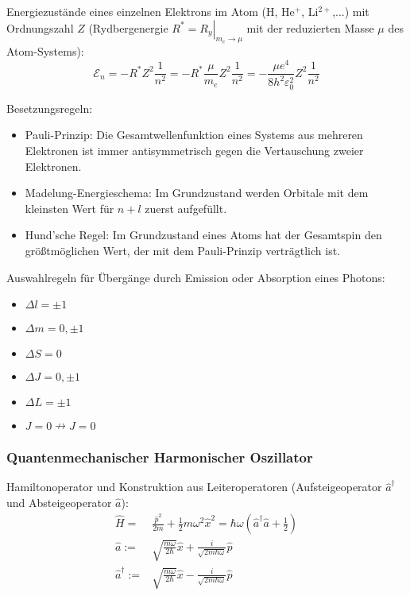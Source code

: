 \documentclass[11pt]{article}
\numberwithin{equation}{section}
\begin{document}
				\noindent
				Energiezustände eines einzelnen Elektrons im Atom ($\mathrm{H}$, $\mathrm{He^{+}}$, $\mathrm{Li^{2+}}$,...) mit Ordnungszahl $Z$ (Rydbergenergie $\left.R^*=R_y\right|_{m_e\rightarrow \mu}$ mit der reduzierten Masse $\mu$ des Atom-Systems):
				\begin{equation}
					\mathcal{E}_n = -R^* Z^2 \frac{1}{n^2} = -R^* \frac{\mu}{m_e} Z^2 \frac{1}{n^2} = - \frac{\mu e^4}{8 h^2 \varepsilon_0^2} Z^2 \frac{1}{n^2}
				\end{equation}

				\noindent
				Besetzungsregeln:
				\begin{itemize}
					\item Pauli-Prinzip: Die Gesamtwellenfunktion eines Systems aus mehreren Elektronen ist immer antisymmetrisch	gegen die Vertauschung zweier Elektronen.
					\item Madelung-Energieschema: Im Grundzustand werden Orbitale mit dem kleinsten Wert für $n+l$ zuerst aufgefüllt.
					\item Hund'sche Regel: Im Grundzustand eines Atoms hat der Gesamtspin den größtmöglichen Wert, der mit dem Pauli-Prinzip verträgtlich ist.
				\end{itemize}

				\noindent
				Auswahlregeln für Übergänge durch Emission oder Absorption eines Photons:
				\begin{itemize}
					\item $\Delta l = \pm 1$
					\item $\Delta m = 0, \pm 1$
					\item $\Delta S = 0$
					\item $\Delta J = 0, \pm 1$
					\item $\Delta L = \pm 1$
					\item $J=0 \nrightarrow J=0$
				\end{itemize}

			\subsubsection{Quantenmechanischer Harmonischer Oszillator}
				\noindent
				Hamiltonoperator und Konstruktion aus Leiteroperatoren (Aufsteigeoperator $\hat{a}^\dagger$ und Absteigeoperator $\hat{a}$):
				\begin{equation}
					\begin{aligned}
						\hat{H} =& \frac{\hat{p}^2}{2m} + \frac{1}{2}m\omega^2 \hat{x}^2 = \hbar\omega(\hat{a}^\dagger \hat{a} + \frac{1}{2}) \\
						\hat{a} :=& \sqrt{\frac{m\omega}{2\hbar}}\hat{x} + \frac{i}{\sqrt{2m\hbar\omega}}\hat{p} \\
						\hat{a}^\dagger :=& \sqrt{\frac{m\omega}{2\hbar}}\hat{x} - \frac{i}{\sqrt{2m\hbar\omega}}\hat{p} \\
					\end{aligned}
				\end{equation}
\end{document}
